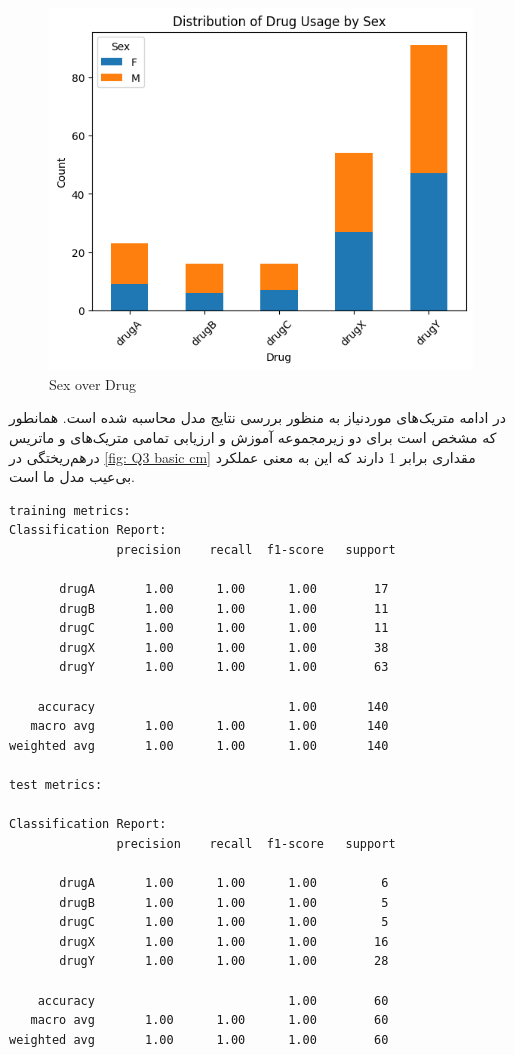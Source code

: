 \documentclass{article}
\begin{document}
 
\begin{figure}[H]
\centering
\includegraphics[width=0.5\linewidth]{"img/Q3/drug vs sex"}
\caption{Sex over Drug}
\label{fig:drug-vs-sex}
\end{figure}

در ادامه متریک‌‌های موردنیاز به منظور بررسی نتایج مدل محاسبه شده است. همانطور که مشخص است برای دو زیرمجموعه آموزش و ارزیابی تمامی متریک‌های و ماتریس درهم‌ریختگی در 
\autoref{fig: Q3 basic cm}
مقداری برابر 1 دارند که این به معنی عملکرد بی‌عیب مدل ما است.
\begin{LTR}
\begin{verbatim}
training metrics:
Classification Report:
               precision    recall  f1-score   support

       drugA       1.00      1.00      1.00        17
       drugB       1.00      1.00      1.00        11
       drugC       1.00      1.00      1.00        11
       drugX       1.00      1.00      1.00        38
       drugY       1.00      1.00      1.00        63

    accuracy                           1.00       140
   macro avg       1.00      1.00      1.00       140
weighted avg       1.00      1.00      1.00       140

test metrics:

Classification Report:
               precision    recall  f1-score   support

       drugA       1.00      1.00      1.00         6
       drugB       1.00      1.00      1.00         5
       drugC       1.00      1.00      1.00         5
       drugX       1.00      1.00      1.00        16
       drugY       1.00      1.00      1.00        28

    accuracy                           1.00        60
   macro avg       1.00      1.00      1.00        60
weighted avg       1.00      1.00      1.00        60
\end{verbatim}
\end{LTR}
\end{document}
